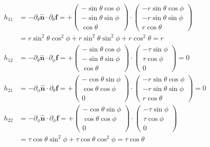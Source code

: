 \documentclass[11pt, DINA4, fleqn]{amsart}
\def\vn{\boldsymbol{n}\xspace}
\def\vf{\boldsymbol{f}\xspace}
\begin{document}
\begin{align}
h_{11} &= -\partial_{\theta} \hat{\vn} \cdot \partial_{\theta} \vf =
+ \begin{pmatrix}
-\sin \theta \cos\phi \\
-\sin \theta \sin\phi \\
\cos \theta
\end{pmatrix}
\cdot
\begin{pmatrix}
-r\sin \theta \cos\phi \\
-r\sin \theta \sin\phi \\
r\cos \theta
\end{pmatrix} \\
&=r\sin^2\theta\cos^2\phi + r\sin^2\theta \sin^2\phi + r\cos^2\theta
= r \\
h_{12} &= -\partial_{\theta} \hat{\vn} \cdot \partial_{\phi} \vf =
+ \begin{pmatrix}
-\sin \theta \cos\phi \\
-\sin \theta \sin\phi \\
\cos \theta
\end{pmatrix}
\cdot
\begin{pmatrix}
-\tau \sin\phi \\
\tau \cos\phi \\
0
\end{pmatrix} = 0 \\
h_{21} &= -\partial_{\phi} \hat{\vn} \cdot \partial_{\theta} \vf =
+ \begin{pmatrix}
-\cos \theta \sin\phi \\
\cos \theta \cos\phi \\
0
\end{pmatrix}
\cdot
\begin{pmatrix}
-r \sin \theta\cos\phi \\
-r \sin \theta \sin\phi \\
r\cos\theta
\end{pmatrix} = 0 \\
h_{22} &= -\partial_{\phi} \hat{\vn} \cdot \partial_{\phi} \vf =
+ \begin{pmatrix}
-\cos \theta \sin\phi \\
\cos \theta \cos\phi \\
0
\end{pmatrix}
\cdot
\begin{pmatrix}
-\tau \sin \phi \\
\tau \cos\phi \\
0
\end{pmatrix} \\
&= \tau \cos\theta\sin^2\phi + \tau \cos\theta \cos^2\phi = \tau \cos \theta
\end{align}
\end{document}
